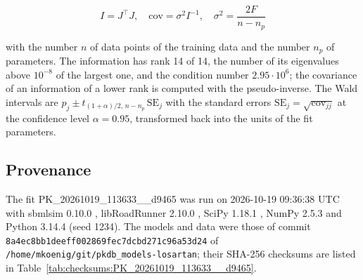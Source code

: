 \begin{equation}
I = J^\top J, \quad \mathrm{cov} = \sigma^2 I^{-1}, \quad \sigma^2 = \frac{2 F}{n - n_p}
\end{equation}

with the number $n$ of data points of the training data and the number $n_p$ of parameters. The information has rank 14 of 14, the number of its eigenvalues above $10^{-8}$ of the largest one, and the condition number $2.95 \cdot 10^{6}$; the covariance of an information of a lower rank is computed with the pseudo-inverse. The Wald intervals are $\hat{p}_j \pm t_{(1+\alpha)/2,\, n-n_p}\, \mathrm{SE}_j$ with the standard errors $\mathrm{SE}_j = \sqrt{\mathrm{cov}_{jj}}$ at the confidence level $\alpha = 0.95$, transformed back into the units of the fit parameters.

\subsection{Provenance}

The fit PK\_20261019\_113633\_\_d9465 was run on 2026-10-19 09:36:38 UTC with sbmlsim 0.10.0 \cite{Koenig2026_sbmlsim}, libRoadRunner 2.10.0 \cite{Welsh2023}, SciPy 1.18.1 \cite{Virtanen2020}, NumPy 2.5.3 \cite{Harris2020} and Python 3.14.4 (seed 1234). The models and data were those of commit \texttt{8a4ec8bb1deeff002869fec7dcbd271c96a53d24} of \texttt{/home/mkoenig/git/pkdb\_models-losartan}; their SHA-256 checksums are listed in Table~\ref{tab:checksums:PK_20261019_113633__d9465}.

